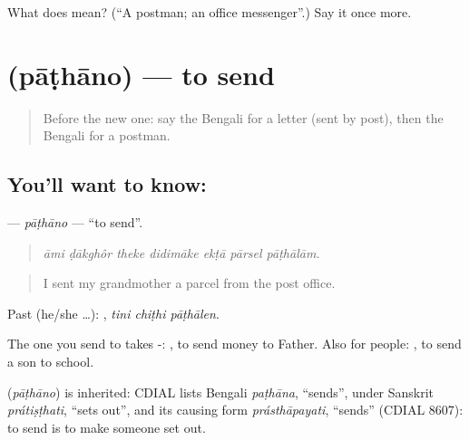 \begin{tcolorbox}[breakable,colback=teal!4,colframe=teal!35!black,title={Before you move on}]
What does  mean? (\textquotedblleft{}A postman; an office messenger\textquotedblright{}.) Say it once more.
\end{tcolorbox}
\section[\texorpdfstring{\bn{পাঠানো} (pāṭhāno)}{পাঠানো (pāṭhāno)}]{ (pāṭhāno) — to send}

\label{lesson:BN-C411-pathano}



\begin{quote}
Before the new one: say the Bengali for a letter (sent by post), then the Bengali for a postman.
\end{quote}

\subsection*{You'll want to know: }
\textbf{} — \emph{pāṭhāno} — \textquotedblleft{}to send\textquotedblright{}.

\begin{quote}
      
\end{quote}

\begin{quote}
\emph{āmi ḍākghôr theke didimāke ekṭā pārsel pāṭhālām.}
\end{quote}

\begin{quote}
I sent my grandmother a parcel from the post office.
\end{quote}

Past (he/she …):   , \emph{tini chiṭhi pāṭhālen}.

The one you send to takes -:   , to send money to Father. Also for people:   , to send a son to school.

\begin{cousinweb}
\textbf{} (\emph{pāṭhāno}) is inherited: CDIAL lists Bengali \emph{paṭhāna}, \textquotedblleft{}sends\textquotedblright{}, under Sanskrit \emph{prátiṣṭhati}, \textquotedblleft{}sets out\textquotedblright{}, and its causing form \emph{prásthāpayati}, \textquotedblleft{}sends\textquotedblright{} (CDIAL 8607): to send is to make someone set out.
\end{cousinweb}

